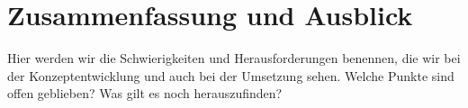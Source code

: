 \chapter{Zusammenfassung und Ausblick}

Hier werden wir die Schwierigkeiten und Herausforderungen benennen, die wir bei der Konzeptentwicklung und auch bei der Umsetzung sehen. Welche Punkte sind offen geblieben? Was gilt es noch herauszufinden? 
